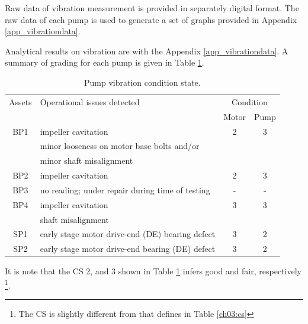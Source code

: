 Raw data of vibration measurement is provided in separately digital format. The raw data of each pump is used to generate a set of graphs provided in Appendix \ref{app_vibrationdata}.

Analytical results on vibration are with the Appendix \ref{app_vibrationdata}. A summary of grading for each pump is given in Table \ref{ch05_tbl_vibration}.

\begin{table}[!h]
	\caption{Pump vibration condition state.}
	\label{ch05_tbl_vibration}
	{\footnotesize
\begin{tabular}{l|l|l|l}
\hline
\multicolumn{1}{c|}{Assets} & Operational issues detected & \multicolumn{2}{c}{Condition} \\ 
\cline{3-4}
\multicolumn{1}{c|}{} &  & \multicolumn{1}{c|}{Motor} & \multicolumn{1}{c}{Pump} \\ 
\hline
\multicolumn{1}{c|}{BP1} & impeller cavitation & \multicolumn{1}{c|}{2} & \multicolumn{1}{c}{3} \\ 
\multicolumn{1}{c|}{} & minor looseness on motor base bolts and/or & \multicolumn{1}{c|}{} & \multicolumn{1}{c}{} \\ 
\multicolumn{1}{c|}{} & minor shaft misalignment & \multicolumn{1}{c|}{} & \multicolumn{1}{c}{} \\ 
\hline
\multicolumn{1}{c|}{BP2} & impeller cavitation & \multicolumn{1}{c|}{2} & \multicolumn{1}{c}{3} \\ 
\hline
\multicolumn{1}{c|}{BP3} & no reading; under repair during time of testing & \multicolumn{1}{c|}{-} & \multicolumn{1}{c}{-} \\ 
\hline
\multicolumn{1}{c|}{BP4} & impeller cavitation & \multicolumn{1}{c|}{3} & \multicolumn{1}{c}{3} \\ 
\multicolumn{1}{c|}{} & shaft misalignment & \multicolumn{1}{c|}{} & \multicolumn{1}{c}{} \\ 
\hline
\multicolumn{1}{c|}{SP1} & early stage motor drive-end (DE) bearing defect & \multicolumn{1}{c|}{3} & \multicolumn{1}{c}{2} \\ 
\hline
\multicolumn{1}{c|}{SP2} & early stage motor drive-end bearing (DE) defect & \multicolumn{1}{c|}{3} & \multicolumn{1}{c}{2} \\ 
\hline
\end{tabular}
	}
\end{table}
It is note that the CS 2, and 3 shown in Table \ref{ch05_tbl_vibration} infers good and fair, respectively \footnote{The CS is slightly different from that defines in Table \ref{ch03:cs}}. 

